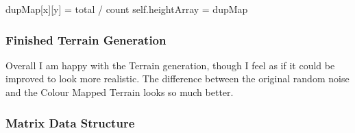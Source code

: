 \begin{flushleft}
\begin{pythoncode}
            dupMap[x][y] = total / count
    self.heightArray = dupMap
            \end{pythoncode}

            \subsubsection{Finished Terrain Generation}
            \vspace{0.25cm}

            Overall I am happy with the Terrain generation, though I feel as if it could be improved to look more realistic.
            The difference between the original random noise and the Colour Mapped Terrain looks so much better.

            \begin{figure}[h]
                \centering
                \qquad
            \end{figure}
            
            \subsubsection{Matrix Data Structure}
                \vspace{0.25cm}


\end{flushleft}
